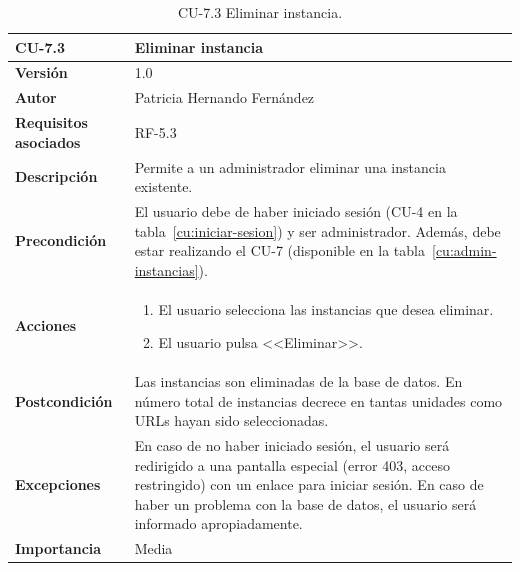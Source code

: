 \begin{table}[p]
	\centering
	\begin{tabularx}{\linewidth}{ p{} p{} }
		\toprule
		\textbf{CU-7.3}    & \textbf{Eliminar instancia}\\
		\toprule
		\textbf{Versión}              & 1.0    \\
		\textbf{Autor}                & Patricia Hernando Fernández \\
		\textbf{Requisitos asociados} & RF-5.3 \\
		\textbf{Descripción}          & Permite a un administrador eliminar una instancia existente.\\
		\textbf{Precondición}         & El usuario debe de haber iniciado sesión (CU-4 en la tabla~\ref{cu:iniciar-sesion}) y ser administrador. Además, debe estar realizando el CU-7 (disponible en la tabla~\ref{cu:admin-instancias}). \\
		\textbf{Acciones}             &
		\begin{enumerate}
			\def\labelenumi{\arabic{enumi}.}
			\tightlist
			\item El usuario selecciona las instancias que desea eliminar.
			\item El usuario pulsa <<Eliminar>>.
		\end{enumerate}\\
		\textbf{Postcondición}        & Las instancias son eliminadas de la base de datos. En número total de instancias decrece en tantas unidades como URLs hayan sido seleccionadas. \\
		\textbf{Excepciones}          & En caso de no haber iniciado sesión, el usuario será redirigido a una pantalla especial (error 403, acceso restringido) con un enlace para iniciar sesión. En caso de haber un problema con la base de datos, el usuario será informado apropiadamente.\\
		\textbf{Importancia}          & Media \\
		\bottomrule
	\end{tabularx}
	\caption{CU-7.3 Eliminar instancia.}
	\label{cu:eliminar-instancia}
\end{table}

